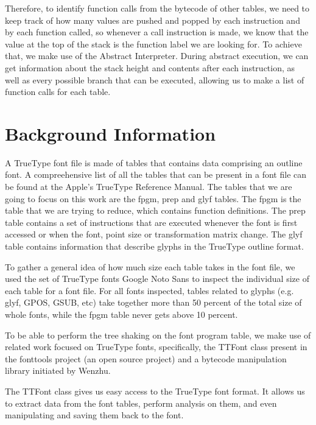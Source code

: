 \documentclass[12pt]{article}
\begin{document}
Therefore, to identify function calls from the bytecode of other tables,
we need to keep track of how many values are pushed and popped by each
instruction and by each function called, so whenever a call instruction
is made, we know that the value at the top of the stack is the function
label we are looking for. To achieve that, we make use of the Abstract
Interpreter. During abstract execution, we can get information about the
stack height and contents after each instruction, as well as every
possible branch that can be executed, allowing us to make a list of function
calls for each table. 


\section{Background Information}

A TrueType font file is made of tables that contains data comprising an
outline font. A compreehensive list of all the tables that can be
present in a font file can be found at the Apple's TrueType Reference
Manual\cite{ttmanual}. The tables that we are going to focus on this
work are the fpgm, prep and glyf tables. The fpgm is the table that we
are trying to reduce, which contains function definitions. The prep
table contains a set of instructions that are executed whenever the font
is first accessed or when the font, point size or transformation matrix
change. The glyf table contains information that describe glyphs in the
TrueType outline format.

To gather a general idea of how much size each table takes in the font
file, we used the set of TrueType fonts Google Noto Sans\cite{notosans}
to inspect the individual size of each table for a font file. For all
fonts inspected, tables related to glyphs (e.g. glyf, GPOS, GSUB, etc)
take together more than 50 percent of the total size of whole fonts,
while the fpgm table never gets above 10 percent.  

To be able to perform the tree shaking on the font program table,
we make use of related work focused on TrueType fonts, specifically,
the TTFont class present in the fonttools project \cite{fonttools} 
(an open source project) and a bytecode manipulation library
\cite{bytecode} initiated by Wenzhu. 

The TTFont class gives us easy access to the TrueType font format. It
allows us to extract data from the font tables, perform analysis on
them, and even manipulating and saving them back to the font. 
\end{document}
